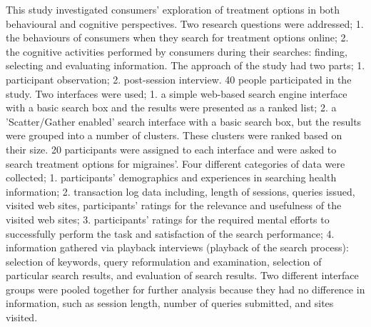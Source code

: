 \documentclass[]{article}
\begin{document}
This study investigated consumers’ exploration of treatment options in both behavioural and cognitive perspectives. Two research questions were addressed; 1. the behaviours of consumers when they search for treatment options online; 2. the cognitive activities performed by consumers during their searches: finding, selecting and evaluating information. The approach of the study had two parts; 1. participant observation; 2. post-session interview. 40 people participated in the study. Two interfaces were used; 1. a simple web-based search engine interface with a basic search box and the results were presented as a ranked list; 2. a 'Scatter/Gather enabled' search interface with a basic search box, but the results were grouped into a number of clusters. These clusters were ranked based on their size. 20 participants were assigned to each interface and were asked to search treatment options for migraines’. Four different categories of data were collected; 1. participants’ demographics and experiences in searching health information; 2. transaction log data including, length of sessions, queries issued, visited web sites, participants’ ratings for the relevance and usefulness of the visited web sites; 3. participants’ ratings for the required mental efforts to successfully perform the task and satisfaction of the search performance; 4. information gathered via playback interviews (playback of the search process): selection of keywords, query reformulation and examination, selection of particular search results, and evaluation of search results. Two different interface groups were pooled together for further analysis because they had no difference in information, such as session length, number of queries submitted, and sites visited.                       
\end{document}
